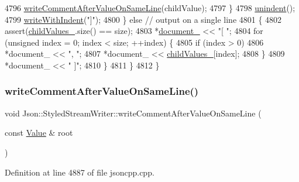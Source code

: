 \begin{DoxyCode}
4796         \hyperlink{class_json_1_1_styled_stream_writer_ad2ca860e317ca91d6b2932535b4ce9c7}{writeCommentAfterValueOnSameLine}(childValue);
4797       \}
4798       \hyperlink{class_json_1_1_styled_stream_writer_a74d8fb9beecd29759d7b79f430386358}{unindent}();
4799       \hyperlink{class_json_1_1_styled_stream_writer_a4e64789373b359c9b7a7244509b918fc}{writeWithIndent}(\textcolor{stringliteral}{"]"});
4800     \} \textcolor{keywordflow}{else} \textcolor{comment}{// output on a single line}
4801     \{
4802       assert(\hyperlink{class_json_1_1_styled_stream_writer_aafd62e00a401df73fcacb2e410114b3d}{childValues\_}.size() == size);
4803       *\hyperlink{class_json_1_1_styled_stream_writer_aa8c4e4576f5c3dcb10955d133a092dd6}{document\_} << \textcolor{stringliteral}{"[ "};
4804       \textcolor{keywordflow}{for} (\textcolor{keywordtype}{unsigned} index = 0; index < size; ++index) \{
4805         \textcolor{keywordflow}{if} (index > 0)
4806           *document\_ << \textcolor{stringliteral}{", "};
4807         *document\_ << \hyperlink{class_json_1_1_styled_stream_writer_aafd62e00a401df73fcacb2e410114b3d}{childValues\_}[index];
4808       \}
4809       *document\_ << \textcolor{stringliteral}{" ]"};
4810     \}
4811   \}
4812 \}
\end{DoxyCode}
\mbox{\label{class_json_1_1_styled_stream_writer_ad2ca860e317ca91d6b2932535b4ce9c7}} 
\subsubsection{\texorpdfstring{write\+Comment\+After\+Value\+On\+Same\+Line()}{writeCommentAfterValueOnSameLine()}}
{\footnotesize\ttfamily void Json\+::\+Styled\+Stream\+Writer\+::write\+Comment\+After\+Value\+On\+Same\+Line (\begin{DoxyParamCaption}\item[{const \hyperlink{class_json_1_1_value}{Value} \&}]{root }\end{DoxyParamCaption})\hspace{0.3cm}{\ttfamily [private]}}



Definition at line 4887 of file jsoncpp.\+cpp.



